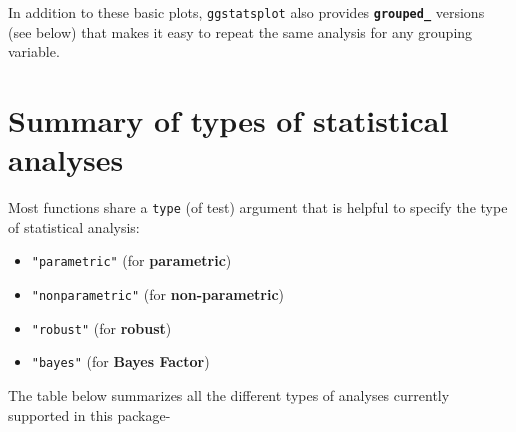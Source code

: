 \documentclass[]{article}
\providecommand{\tightlist}{%
  \setlength{\itemsep}{0pt}\setlength{\parskip}{0pt}}
\begin{document}
In addition to these basic plots, \texttt{ggstatsplot} also provides
\textbf{\texttt{grouped\_}} versions (see below) that makes it easy to
repeat the same analysis for any grouping variable.

\hypertarget{summary-of-types-of-statistical-analyses}{%
\section{Summary of types of statistical
analyses}\label{summary-of-types-of-statistical-analyses}}

Most functions share a \texttt{type} (of test) argument that is helpful
to specify the type of statistical analysis:

\begin{itemize}
\tightlist
\item
  \texttt{"parametric"} (for \textbf{parametric})
\item
  \texttt{"nonparametric"} (for \textbf{non-parametric})
\item
  \texttt{"robust"} (for \textbf{robust})
\item
  \texttt{"bayes"} (for \textbf{Bayes Factor})
\end{itemize}

The table below summarizes all the different types of analyses currently
supported in this package-
\end{document}
